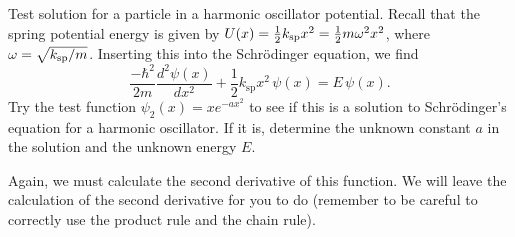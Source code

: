 \begin{example}{Test solution for a particle in a harmonic oscillator potential.}
Recall that the spring potential energy is given by 
$U(x) = \frac{1}{2}k_{\rm sp}x^2 = \frac{1}{2}m\omega^2x^2$, where 
$\omega = \sqrt{k_{\rm sp}/m}$.  Inserting this into the 
Schr\"odinger equation, we find
\begin{equation}
\frac{-\hbar^2}{2m}\frac{d^2\psi(x)}{dx^2} + \frac{1}{2}k_\text{sp}x^2\,\psi(x)
= E\,\psi(x).
\label{eq:schroed_spring}
\end{equation}
Try the test function $\psi_2(x)=xe^{-ax^2}$ to see if this is a solution
to Schr\"odinger's equation for a harmonic oscillator.  If it is,
determine the unknown constant $a$ in the solution and the unknown energy $E$.

\begin{solution}
Again, we must calculate the second derivative of this
function.  We will leave the calculation of the second derivative for
you to do (remember to be careful to correctly use the product rule and
the chain rule).

\end{solution}
\end{example}
